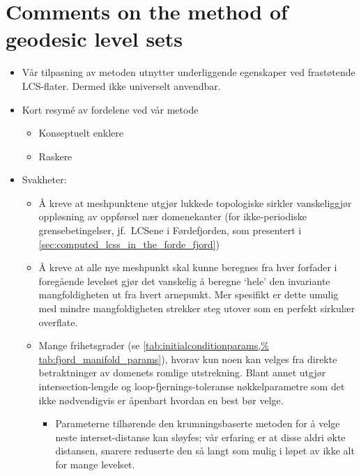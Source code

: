 \section{Comments on the method of geodesic level sets}
\label{sec:comments_on_the_method_of_geodesic_level_sets}




\begin{framed}
    \begin{itemize}
        \item Vår tilpasning av metoden utnytter underliggende egenskaper ved
            frastøtende LCS-flater. Dermed ikke universelt anvendbar.
        \item Kort resym{\'e} av fordelene ved vår metode
            \begin{itemize}
                \item Konseptuelt enklere
                \item Raskere
            \end{itemize}
        \item Svakheter:
            \begin{itemize}
                \item Å kreve at meshpunktene utgjør lukkede topologiske
                    sirkler vanskeliggjør oppløsning av oppførsel nær
                    domenekanter (for ikke-periodiske grensebetingelser, jf.\
                    LCSene i Førdefjorden, som presentert i
                    \cref{sec:computed_lcss_in_the_forde_fjord})
                \item Å kreve at alle nye meshpunkt skal kunne beregnes fra
                    hver forfader i foregående levelset gjør det vanskelig å
                    beregne `hele' den invariante mangfoldigheten ut fra hvert
                    arnepunkt. Mer spesifikt er dette umulig med mindre
                    mangfoldigheten strekker steg utover som en perfekt
                    sirkulær overflate.
                \item Mange frihetsgrader (se
                    \cref{tab:initialconditionparams,%
                    tab:fjord_manifold_params}), hvorav kun noen kan velges fra
                    direkte betraktninger av domenets romlige utstrekning.
                    Blant annet utgjør intersection-lengde og
                    loop-fjernings-toleranse nøkkelparametre som det ikke
                    nødvendigvis er åpenbart hvordan en best bør velge.
                    \begin{itemize}
                        \item Parameterne tilhørende den krumningsbaserte
                            metoden for å velge neste interset-distanse kan
                            sløyfes; vår erfaring er at disse aldri økte
                            distansen, snarere reduserte den så langt som mulig
                            i løpet av ikke alt for mange levelset.


\end{itemize}
\end{itemize}
\end{itemize}
\end{framed}
